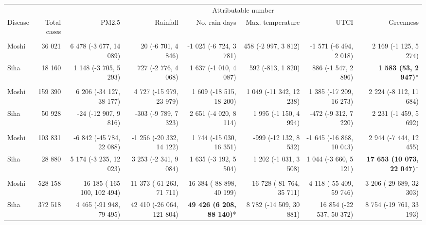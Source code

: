 \begin{table}[t]
\fontsize{12.0pt}{14.4pt}\selectfont
\begin{tabular*}{\linewidth}{@{\extracolsep{\fill}}l|rrrrrrr}
\toprule
 &  & \multicolumn{6}{c}{Attributable number} \\ 
\cmidrule(lr){3-8}
Disease & Total cases & PM2.5 & Rainfall & No. rain days & Max. temperature & UTCI & Greenness \\ 
\midrule\addlinespace[2.5pt]
\multicolumn{8}{l}{Chronic Respiratory Disease} \\[2.5pt] 
\midrule\addlinespace[2.5pt]
Moshi & 36 021 & 6 478 (-3 677, 14 089) & 20 (-6 701, 4 846) & -1 025 (-6 724, 3 781) & 458 (-2 997, 3 812) & -1 571 (-6 494, 2 018) & 2 169 (-1 125, 5 274) \\ 
Siha & 18 160 & 1 148 (-3 705, 5 293) & 727 (-2 776, 4 068) & 1 637 (-1 010, 4 087) & 592 (-813, 1 820) & 886 (-1 547, 2 896) & \textbf{1 583 (53, 2 947)}* \\ 
\midrule\addlinespace[2.5pt]
\multicolumn{8}{l}{Hypertension} \\[2.5pt] 
\midrule\addlinespace[2.5pt]
Moshi & 159 390 & 6 206 (-34 127, 38 177) & 4 727 (-15 979, 23 979) & 1 609 (-18 515, 18 200) & 1 049 (-11 342, 12 238) & 1 385 (-17 209, 16 273) & 2 224 (-8 112, 11 684) \\ 
Siha & 50 928 & -24 (-12 907, 9 816) & -303 (-9 789, 7 323) & 2 651 (-4 020, 8 114) & 1 995 (-1 150, 4 994) & -472 (-9 312, 7 220) & 2 231 (-1 459, 5 692) \\ 
\midrule\addlinespace[2.5pt]
\multicolumn{8}{l}{Diabetes Mellitus} \\[2.5pt] 
\midrule\addlinespace[2.5pt]
Moshi & 103 831 & -6 842 (-45 784, 22 088) & -1 256 (-20 332, 14 122) & 1 744 (-15 030, 16 351) & -999 (-12 132, 8 532) & -1 645 (-16 868, 10 043) & 2 944 (-7 444, 12 455) \\ 
Siha & 28 880 & 5 174 (-3 235, 12 023) & 3 253 (-2 341, 9 084) & 1 635 (-3 192, 5 504) & 1 202 (-1 031, 3 508) & 1 044 (-3 660, 5 121) & \textbf{17 653 (10 073, 22 047)}* \\ 
\midrule\addlinespace[2.5pt]
\multicolumn{8}{l}{Upper Respiratory Infections} \\[2.5pt] 
\midrule\addlinespace[2.5pt]
Moshi & 528 158 & -16 185 (-165 100, 102 494) & 11 373 (-61 263, 71 711) & -16 384 (-88 898, 40 199) & -16 728 (-81 764, 35 711) & 4 118 (-55 409, 59 746) & 3 206 (-29 689, 32 303) \\ 
Siha & 372 518 & 4 465 (-91 948, 79 495) & 42 410 (-26 064, 121 804) & \textbf{49 426 (6 208, 88 140)}* & 8 782 (-14 509, 30 881) & 16 854 (-22 537, 50 372) & 8 754 (-19 761, 33 193) \\ 

\end{tabular*}
\end{table}
